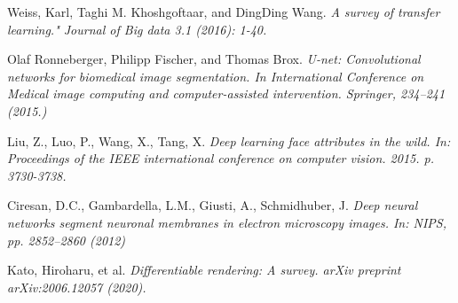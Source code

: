 \documentclass[12pt,a4]{article}
\begin{document}
\begin{thebibliography}{9}
    Weiss, Karl, Taghi M. Khoshgoftaar, and DingDing Wang.
    \textit{A survey of transfer learning." Journal of Big data 3.1 (2016): 1-40.}

    Olaf Ronneberger, Philipp Fischer, and Thomas Brox.
    \textit{U-net: Convolutional networks for biomedical image segmentation. In International Conference on Medical image computing and computer-assisted intervention. Springer, 234–241 (2015.)}

    Liu, Z., Luo, P., Wang, X., Tang, X.
    \textit{Deep learning face attributes in the wild. In: Proceedings of the IEEE international conference on computer vision. 2015. p. 3730-3738.}

    Ciresan, D.C., Gambardella, L.M., Giusti, A., Schmidhuber, J.
    \textit{Deep neural networks segment neuronal membranes in electron microscopy images. In: NIPS, pp. 2852–2860 (2012)}

    Kato, Hiroharu, et al.
    \textit{Differentiable rendering: A survey. arXiv preprint arXiv:2006.12057 (2020).}

	\end{thebibliography}
\end{document}
